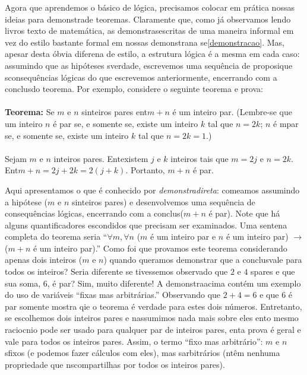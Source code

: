Agora que aprendemos o b\'asico de l\'ogica, precisamos colocar em pr\'atica nossas ideias para demonstra\cao de teoremas. Claramente que, como j\'a observamos lendo livros texto de matem\'atica, as demonstra\coes s\ao escritas de uma maneira informal em vez do estilo bastante formal em nossas demonstra\coes na se\cao \ref{demonstracao}. Mas, apesar desta \'obvia diferen\cc a de estilo, a estrutura l\'ogica \'e a mesma em cada caso: assumindo que as hip\'oteses s\ao verdade, escrevemos uma sequ\^encia de proposi\coes que s\ao consequ\^encias l\'ogicas do que escrevemos anteriormente, encerrando com a conclus\ao do teorema. Por exemplo, considere o seguinte teorema e prova:
\\
\\
{\bf Teorema:} Se $m$ e $n$ s\ao inteiros pares ent\ao $m+n$ \'e um inteiro par. (Lembre-se que um inteiro $n$ \'e par se, e somente se, existe um inteiro $k$ tal que $n=2k$; $n$ \'e \ih mpar se, e somente se, existe um inteiro $k$ tal que $n=2k=1$.)
\\
\\
{\demo} Sejam $m$ e $n$ inteiros pares. Ent\ao existem $j$ e $k$ inteiros tais que $m=2j$ e $n=2k$. Ent\ao $m+n=2j+2k=2(j+k)$. Portanto, $m+n$ \'e par. \fim

Aqui apresentamos o que \'e conhecido por {\it demonstra\cao direta}: come\cc amos assumindo a hip\'otese ($m$ e $n$ s\ao inteiros pares) e desenvolvemos uma sequ\^encia de consequ\^encias l\'ogicas, encerrando com a conclus\ao ($m+n$ \'e par). Note que h\'a alguns quantificadores escondidos que precisam ser examinados. Uma senten\cc a completa do teorema seria ``$\forall m, \forall n$ ($m$ \'e um inteiro par e $n$ \'e um inteiro par) $\to$ ($m+n$ \'e um inteiro par).'' Como foi que provamos este teorema considerando apenas dois inteiros ($m$ e $n$) quando quer\ih amos demonstrar que a conclus\ao vale para todos os inteiros? Seria diferente se tivessemos observado que $2$ e $4$ s\ao pares e que sua soma, $6$, \'e par? Sim, muito diferente! A demonstra\cao acima cont\'em um exemplo do uso de vari\'aveis ``fixas mas arbitr\'arias.'' Observando que $2+4=6$ e que $6$ \'e par somente mostra qie o teorema \'e verdade para estes dois n\'umeros. Entretanto, se escolhemos dois inteiros pares e n\ao assumimos nada mais sobre eles ent\ao o mesmo racioc\ih nio pode ser usado para qualquer par de inteiros pares, ent\ao a prova \'e geral e vale para todos os inteiros pares. Assim, o termo ``fixo mas arbitr\'ario'': $m$ e $n$ s\ao fixos (e podemos fazer c\'alculos com eles), mas s\ao arbitr\'arios (n\ao t\^em nenhuma propriedade que n\ao s\ao compartilhas por todos os inteiros pares).

